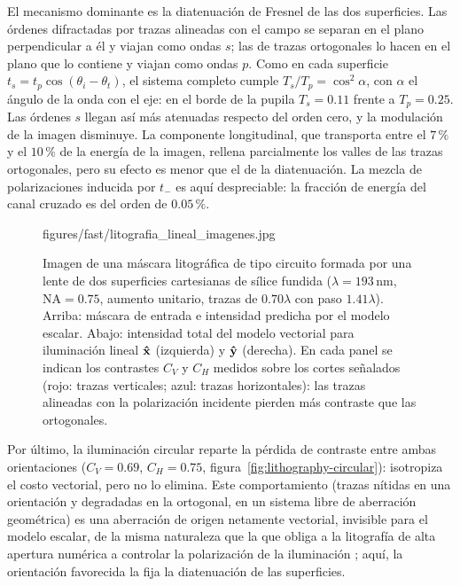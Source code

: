 El mecanismo dominante es la diatenuación de Fresnel de las dos superficies.
Las órdenes difractadas por trazas alineadas con el campo se separan en el
plano perpendicular a él y viajan como ondas $s$; las de trazas ortogonales
lo hacen en el plano que lo contiene y viajan como ondas $p$. Como en cada
superficie $t_s=t_p\cos(\theta_i-\theta_t)$, el sistema completo cumple
$T_s/T_p=\cos^2\alpha$, con $\alpha$ el ángulo de la onda con el eje: en el
borde de la pupila $T_s=0.11$ frente a $T_p=0.25$. Las órdenes $s$ llegan así
más atenuadas respecto del orden cero, y la modulación de la imagen
disminuye. La componente longitudinal, que transporta entre el $7\,\%$ y el
$10\,\%$ de la energía de la imagen, rellena parcialmente los valles de las
trazas ortogonales, pero su efecto es menor que el de la diatenuación. La
mezcla de polarizaciones inducida por $t_-$ es aquí despreciable: la fracción
de energía del canal cruzado es del orden de $0.05\,\%$.

\begin{figure}[!htbp]
  \centering
    {figures/fast/litografia_lineal_imagenes.jpg}
  \caption{Imagen de una máscara litográfica de tipo circuito formada por una
  lente de dos superficies cartesianas de sílice fundida
  ($\lambda=193\,\mathrm{nm}$, $\mathrm{NA}=0.75$, aumento unitario, trazas
  de $0.70\lambda$ con paso $1.41\lambda$). Arriba: máscara de entrada e
  intensidad predicha por el modelo escalar. Abajo: intensidad total del
  modelo vectorial para iluminación lineal $\bm{\hat{\mathbf{x}}}$ (izquierda) y $\bm{\hat{\mathbf{y}}}$
  (derecha). En cada panel se indican los contrastes $C_V$ y $C_H$ medidos
  sobre los cortes señalados (rojo: trazas verticales; azul: trazas
  horizontales): las trazas alineadas con la polarización incidente pierden
  más contraste que las ortogonales.}
  \label{fig:lithography-general-non-axisymmetric}
\end{figure}

Por último, la iluminación circular reparte la pérdida de contraste entre ambas
orientaciones ($C_V=0.69$, $C_H=0.75$, figura~\ref{fig:lithography-circular}):
isotropiza el costo vectorial, pero no lo elimina. Este comportamiento (trazas
nítidas en una orientación y degradadas en la ortogonal, en un sistema libre de
aberración geométrica) es una aberración de origen netamente vectorial,
invisible para el modelo escalar, de la misma naturaleza que la que obliga a
la litografía de alta apertura numérica a controlar la polarización de la
iluminación \cite{flagello1996, ruoff2009}; aquí, la orientación favorecida la
fija la diatenuación de las superficies.

